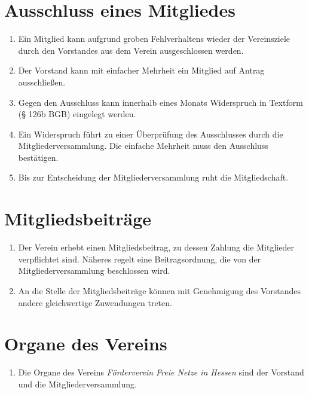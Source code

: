 \documentclass[ngerman]{article}
\newcommand{\NameVerein}{Förderverein Freie Netze in Hessen}
\begin{document}
\section{Ausschluss eines Mitgliedes}
\begin{enumerate}
  \item Ein Mitglied kann aufgrund groben Fehlverhaltens wieder der Vereinsziele durch den Vorstandes aus dem Verein ausgeschlossen werden.
  \item Der Vorstand kann mit einfacher Mehrheit ein Mitglied auf Antrag ausschließen.
  \item Gegen den Ausschluss kann innerhalb eines Monats Widerspruch in Textform (§ 126b BGB) eingelegt werden.
  \item Ein Widerspruch führt zu einer Überprüfung des Ausschlusses durch die Mitgliederversammlung. Die einfache Mehrheit muss den Ausschluss bestätigen.
  \item Bis zur Entscheidung der Mitgliederversammlung ruht die Mitgliedschaft.
\end{enumerate}


\section{Mitgliedsbeiträge}
\begin{enumerate}
  \item Der Verein erhebt einen Mitgliedsbeitrag, zu dessen Zahlung die Mitglieder verpflichtet sind. Näheres regelt eine Beitragsordnung, die von der Mitgliederversammlung beschlossen wird.
  \item An die Stelle der Mitgliedsbeiträge können mit Genehmigung des Vorstandes andere gleichwertige Zuwendungen treten.
\end{enumerate}


\section{Organe des Vereins}
\begin{enumerate}
  \item Die Organe des Vereins \emph{\NameVerein} sind der Vorstand und die Mitgliederversammlung.
\end{enumerate}
\end{document}
